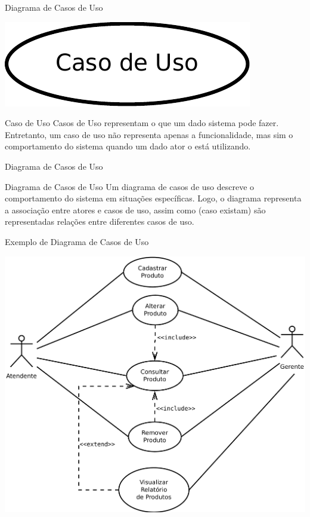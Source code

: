 \documentclass[xcolor=x11names,compress]{beamer}
\begin{document}
\begin{frame}{Diagrama de Casos de Uso}

\centering \includegraphics[keepaspectratio,width=.5\textwidth]{Caso_de_Uso}

\begin{alertblock}{Caso de Uso}
Casos de Uso representam o que um dado sistema pode fazer. Entretanto, um caso de uso não representa apenas a funcionalidade, mas sim o comportamento do sistema quando um dado ator o está utilizando.
\end{alertblock}

\end{frame}

\begin{frame}{Diagrama de Casos de Uso}

\begin{alertblock}{Diagrama de Casos de Uso}
Um diagrama de casos de uso descreve o comportamento do sistema em situações específicas. Logo, o diagrama representa a associação entre atores e casos de uso, assim como (caso existam) são representadas relações entre diferentes casos de uso.
\end{alertblock}

\end{frame}

\begin{frame}{Exemplo de Diagrama de Casos de Uso}

\centering \includegraphics[keepaspectratio,width=.7\textwidth]{Diagrama_Casos_De_Uso_Controle_Estoque}

\end{frame}
\end{document}
